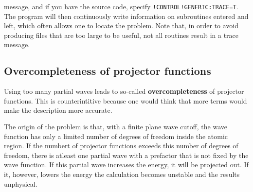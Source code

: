 \documentclass[final,12pt]{article}
\begin{document}
{{{{{{\begin{enumerate}
  message, and if you have the source code, specify
  \verb|!CONTROL!GENERIC:TRACE=T|. The program will then
  continuously write information on subroutines entered and left,
  which often allows one to locate the problem. Note that, in order to
  avoid producing files that are too large to be useful, not all routines
  result in a trace message.   %
\end{enumerate}


\subsection{Overcompleteness of projector functions}
Using too many partial waves leads to so-called
\textbf{overcompleteness} of projector
functions.  This is counterintitive because one would think that more
terms would make the description more accurate. 

The origin of the problem is that, with a finite plane wave cutoff,
the wave function has only a limited number of degrees of freedom
inside the atomic region. If the numbert of projector functions
exceeds this number of degrees of freedom, there is atleast one
partial wave with a prefactor that is not fixed by the wave function.
If this partial wave increases the energy, it will be projected
out. If it, however, lowers the energy the calculation becomes
unstable and the results unphysical.

}}}}}}
\end{document}
